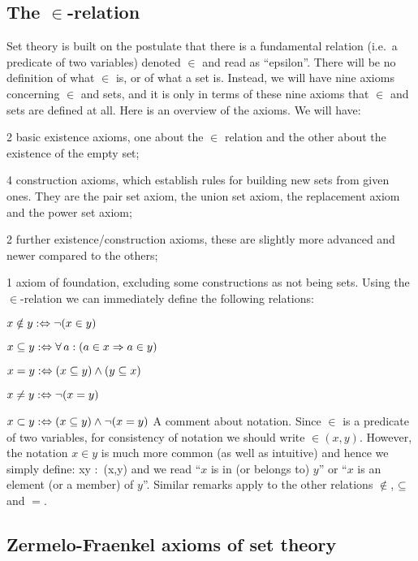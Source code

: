 \subsection[\texorpdfstring{The $\in$-relation}{The epsilon-relation}]{The $\in$-relation}

Set theory is built on the postulate that there is a fundamental relation (i.e.\ a predicate of two variables) denoted $\in$\index{$\in$} and read as ``epsilon''.
There will be no definition of what $\in$ is, or of what a set is.
Instead, we will have nine axioms concerning $\in$ and sets, and it is only in terms of these nine axioms that $\in$ and sets are defined at all.
Here is an overview of the axioms. We will have:
\bit
\item 2 basic existence axioms, one about the $\in$ relation and the other about the existence of the empty set;
\item 4 construction axioms, which establish rules for building new sets from given ones.
They are the pair set axiom, the union set axiom, the replacement axiom and the power set axiom; 
\item 2 further existence/construction axioms, these are slightly more advanced and newer compared to the others;
\item 1 axiom of foundation, excluding some constructions as not being sets.
\eit
Using the $\in$-relation we can immediately define the following relations:
\bit
\item $x\notin y :\Leftrightarrow \neg(x\in y)$
\item $x\subseteq y :\Leftrightarrow \forall \, a : (a\in x \Rightarrow a\in y)$
\item $x = y :\Leftrightarrow (x\subseteq y) \land (y\subseteq x)$
\item $x \neq y :\Leftrightarrow \neg(x = y)$
\item $x \subset y :\Leftrightarrow (x \subseteq y) \land \neg (x = y)$
\eit
\br
A comment about notation.
Since $\in$ is a predicate of two variables, for consistency of notation we should write $\in\!\!(x,y)$.
However, the notation $x\in y$ is much more common (as well as intuitive) and hence we simply define:
\bse
x\in y :\eqv\ \in\!\!(x,y)
\ese
and we read ``$x$ is in (or belongs to) $y$'' or ``$x$ is an element (or a member) of $y$''.  Similar remarks apply to the other relations $\notin$, $\subseteq$ and $=$.
\er

\subsection{Zermelo-Fraenkel axioms of set theory}

